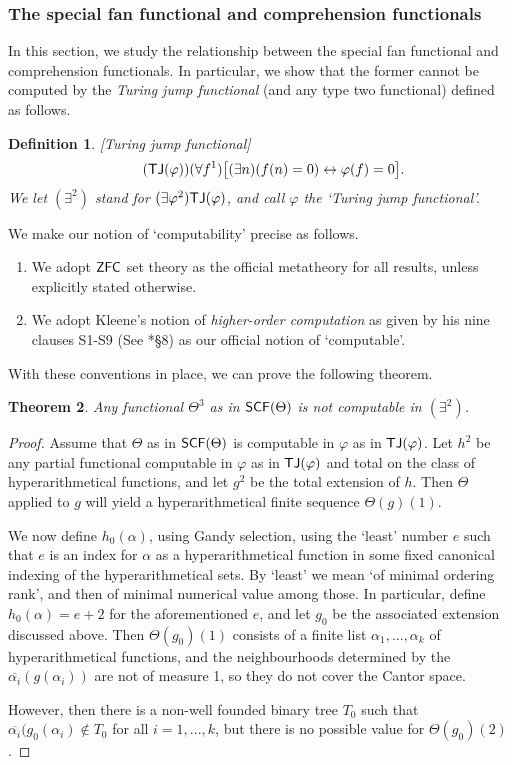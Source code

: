 \documentclass[reqno]{amsart}
\newtheorem{thm}{Theorem}
\newtheorem{defi}[thm]{Definition}
\newcommand\be{\begin{equation}}
\newcommand\ee{\end{equation}}
\def\bdefi{\begin{defi}\rm}
\def\edefi{\end{defi}}
\def\ZFC{\textup{\textsf{ZFC}}}
\def\asa{\leftrightarrow}
\def\TJ{\textup{\textsf{TJ}}}
\def\SCF{\textup{\textsf{SCF}}}
\numberwithin{equation}{section}
\numberwithin{thm}{section}
\begin{document}
\subsubsection{The special fan functional and comprehension functionals}\label{tokie}
In this section, we study the relationship between the special fan functional and comprehension functionals.  
In particular, we show that the former cannot be computed by the \emph{Turing jump functional} (and any type two functional) defined as follows.
\bdefi[Turing jump functional]\label{TJ}
\be\tag{$\TJ(\varphi)$}
(\forall f^{1})\big[(\exists n)(f(n)=0)\asa \varphi(f)=0  \big].
\ee
We let $(\exists^2)$ stand for $(\exists \varphi^{2})\TJ(\varphi)$, and call $\varphi$ the `Turing jump functional'. 
\edefi
We make our notion of `computability' precise as follows.  
\begin{enumerate}
\item We adopt $\ZFC$ set theory as the official metatheory for all results, unless explicitly stated otherwise.
\item We adopt Kleene's notion of \emph{higher-order computation} as given by his nine clauses S1-S9 (See \cite{longmann}*{\S8}) as our official notion of `computable'.
\end{enumerate}
With these conventions in place, we can prove the following theorem.
\begin{thm}\label{import}
Any functional $\Theta^{3}$ as in $\SCF(\Theta)$ is not computable in $(\exists^{2})$.   
\end{thm}
\begin{proof}
Assume that $\Theta$ as in $\SCF(\Theta)$ is computable in $\varphi$ as in $\TJ(\varphi)$. 
Let $h^{2}$ be any partial functional computable in $\varphi$ as in $\TJ(\varphi)$ and total on the class of hyperarithmetical functions, and let $g^{2}$ be the total extension of $h$.
Then $\Theta$ applied to $g$ will yield a hyperarithmetical finite sequence $\Theta(g)(1)$.

\medskip

We now define $h_{0}(\alpha)$, using Gandy selection, using the `least' number $e$ such that $e$ is an index for $\alpha$ as a hyperarithmetical function in some fixed canonical indexing of the hyperarithmetical sets. By `least' we mean `of minimal ordering rank', and then of minimal numerical value among those.
In particular, define $h_{0}(\alpha) = e + 2$ for the aforementioned $e$, and let $g_{0}$ be the associated extension discussed above.  Then $\Theta(g_{0})(1)$ consists of a  finite list $\alpha_1 , . . . , \alpha_k$ of hyperarithmetical functions, and the neighbourhoods determined by the $\overline{ \alpha_i}(g(\alpha_i))$ are not of measure 1, so they do not cover the Cantor space.

\medskip

However, then there is a non-well founded binary tree $T_{0}$ such that $ \overline{\alpha_i}(g_{0}(\alpha_i) \not \in T_{0}$ for all $i = 1 , . . . , k$, but there is no possible value for $\Theta(g_{0})(2)$.
\end{proof}
\end{document}

